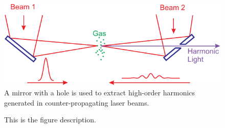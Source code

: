 \documentclass[oneside, astronomy, noacknowlegments]{BYUPhys}
\begin{document}
\begin{figure}
    \centerline{\includegraphics{Graphic1}}
    \caption[Setup for using counter-propagating light]{\label{fig:MirrorDiagram}
     A mirror with a hole is used to extract high-order harmonics generated in
     counter-propagating laser beams.}
\end{figure}

\begin{figure}
    \caption[SiC energy levels and zero-field splitting]{\label{fig:SiCZeeman}
     This is the figure description.}
 \end{figure}







\printindex
\end{document}
